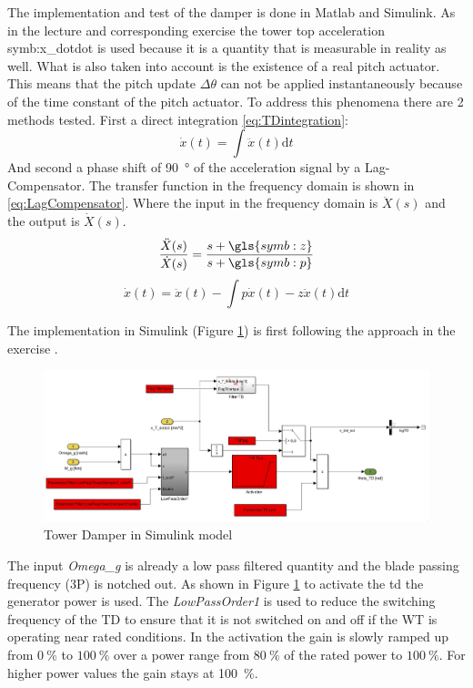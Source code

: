 The implementation and test of the damper is done in Matlab and Simulink.
As in the lecture \cite{SchlipfLecture} and corresponding exercise the tower top acceleration \gls{symb:x_dotdot} is used because it is a quantity that is measurable in reality as well.
What is also taken into account is the existence of a real pitch actuator. This means that the pitch update $\Delta\theta$ can not be applied instantaneously because of the time constant of the pitch actuator.
To address this phenomena there are 2 methods tested. 
First a direct integration \ref{eq:TDintegration}: 
\begin{equation}
	\dot{x}(t) = \int\ddot{x}(t) \text{d}t
	\label{eq:TDintegration}
\end{equation} 
And second a phase shift of \SI{90}{\degree} of the acceleration signal by a Lag-Compensator. The transfer function in the frequency domain is shown in \ref{eq:LagCompensator}. Where the input in the frequency domain is $\ddot{X}(s)$ and the output is $\dot{X}(s)$. 
\begin{equation}
	\frac{\ddot{X}(s)}{\dot{X}(s)} = \frac{s + \gls{symb:z}}{s + \gls{symb:p}}
	\label{eq:LagCompensator}
\end{equation} 
\begin{equation}
	\dot{x}(t) = \ddot{x}(t) - \int p\dot{x}(t) - z\ddot{x}(t) \text{d}t
	\label{eq:xddTimeDomain}
\end{equation} 


The implementation in Simulink (Figure \ref{fig:TDoverview}) is first following the approach in the exercise \cite{SchlipfLecture}.

\begin{figure}[tbh]
	\centering	
	\includegraphics[width=12cm]{Figures/TDoverview}
	\caption{Tower Damper in Simulink model}
	\label{fig:TDoverview}
\end{figure} 

The input \textit{Omega\_g} is already a low pass filtered quantity and the blade passing frequency (3P) is notched out. As shown in Figure \ref{fig:TDoverview} to activate the \gls{td} the generator power is used. The \textit{LowPassOrder1} is used to reduce the switching frequency of the TD to ensure that it is not switched on and off if the \gls{WT} is operating near rated conditions. In the activation the gain is slowly ramped up from $\SI{0}{\%}$ to $\SI{100}{\%}$ over a power range from $\SI{80}{\%}$ of the rated power to $\SI{100}{\%}$.
For higher power values the gain stays at \SI{100}{\%}.

